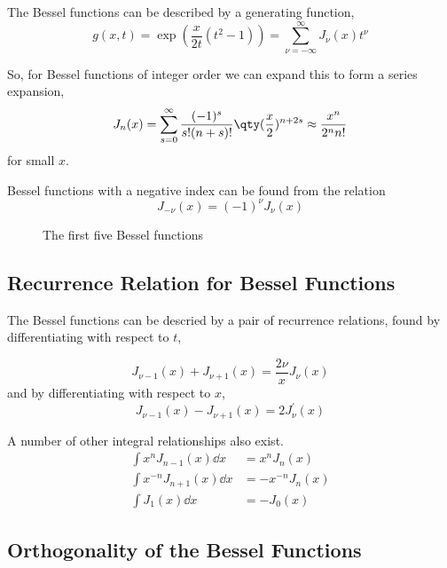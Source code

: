 The Bessel functions can be described by a generating function,
\begin{equation}
  \label{eq:besselgen}
  g(x,t) = \exp(\frac{x}{2t}(t^2-1)) = \sum_{\nu=-\infty}^{\infty} J_{\nu}(x) t^{\nu}
\end{equation}

So, for Bessel functions of integer order we can expand this to form a series expansion,
\begin{equation}
  \label{eq:besselseriesexp}
  J_n(x) = \sum^{\infty}_{s=0} \frac{(-1)^s}{s! (n+s)!} \qty( \frac{x}{2} )^{n+2s} \approx \frac{x^n}{2^n n!}
\end{equation}
for small $x$.

Bessel functions with a negative index can be found from the relation
\begin{equation}
  \label{eq:negativebessel}
  J_{-\nu}(x) = (-1)^{\nu} J_{\nu}(x)
\end{equation}

\begin{figure}
  \centering
  
  \caption{The first five Bessel functions}
  \label{fig:bessel}
\end{figure}

\subsection{Recurrence Relation for Bessel Functions}
\label{sec:besselrecu}
The Bessel functions can be descried by a pair of recurrence relations, found by differentiating with respect to $t$,

\begin{equation}
  \label{eq:recurrencebessel}
  J_{\nu-1}(x) + J_{\nu+1}(x) = \frac{2 \nu}{x} J_{\nu}(x)
\end{equation}
and by differentiating with respect to $x$,
\begin{equation}
  \label{eq:recurrencebessel2}
  J_{\nu-1}(x) - J_{\nu+1}(x) = 2J_{\nu}^{\prime}(x)
\end{equation}

A number of other integral relationships also exist.
\begin{align}
  \int x^n J_{n-1}(x) \dd{x} &= x^n J_n(x) \\
  \int x^{-n} J_{n+1}(x) \dd{x} &= -x^{-n} J_n(x) \\
  \int J_1(x) \dd{x} &= -J_0(x)
\end{align}

\subsection{Orthogonality of the Bessel Functions}
\label{sec:orthogonbessel}

